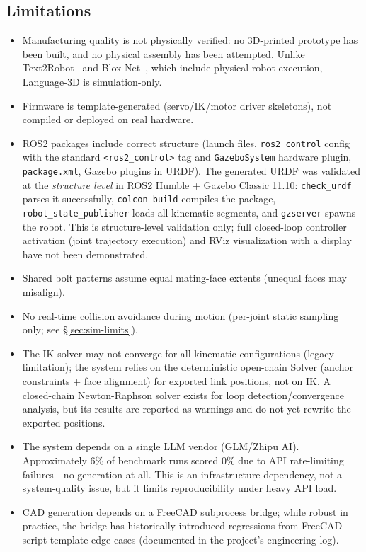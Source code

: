 \documentclass[conference]{IEEEtran}
\begin{document}
\subsection{Limitations}
\begin{itemize}
    \item Manufacturing quality is not physically verified: no 3D-printed prototype has been built, and no physical assembly has been attempted. Unlike Text2Robot~\cite{text2robot2025} and Blox-Net~\cite{bloxnet2025}, which include physical robot execution, Language-3D is simulation-only.
    \item Firmware is template-generated (servo/IK/motor driver skeletons), not compiled or deployed on real hardware.
    \item ROS2 packages include correct structure (launch files, \texttt{ros2\_control} config with the standard \texttt{<ros2\_control>} tag and \texttt{GazeboSystem} hardware plugin, \texttt{package.xml}, Gazebo plugins in URDF). The generated URDF was validated at the \emph{structure level} in ROS2 Humble + Gazebo Classic 11.10: \texttt{check\_urdf} parses it successfully, \texttt{colcon build} compiles the package, \texttt{robot\_state\_publisher} loads all kinematic segments, and \texttt{gzserver} spawns the robot. This is structure-level validation only; full closed-loop controller activation (joint trajectory execution) and RViz visualization with a display have not been demonstrated.
    \item Shared bolt patterns assume equal mating-face extents (unequal faces may misalign).
    \item No real-time collision avoidance during motion (per-joint static sampling only; see \S\ref{sec:sim-limits}).
    \item The IK solver may not converge for all kinematic configurations (legacy limitation); the system relies on the deterministic open-chain Solver (anchor constraints + face alignment) for exported link positions, not on IK. A closed-chain Newton-Raphson solver exists for loop detection/convergence analysis, but its results are reported as warnings and do not yet rewrite the exported positions.
    \item The system depends on a single LLM vendor (GLM/Zhipu AI). Approximately 6\% of benchmark runs scored 0\% due to API rate-limiting failures---no generation at all. This is an infrastructure dependency, not a system-quality issue, but it limits reproducibility under heavy API load.
    \item CAD generation depends on a FreeCAD subprocess bridge; while robust in practice, the bridge has historically introduced regressions from FreeCAD script-template edge cases (documented in the project's engineering log).

\end{itemize}
\end{document}
